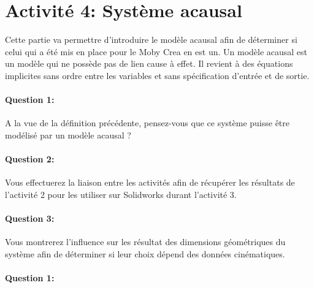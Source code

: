\section{Activité 4: Système acausal}

Cette partie va permettre d'introduire le modèle \og acausal \fg afin de déterminer si celui qui a été mis en place pour le Moby Crea en est un. Un modèle \og acausal \fg est un modèle qui ne possède pas de lien cause à effet. Il revient à des équations implicites sans ordre entre les variables et sans spécification d'entrée et de sortie.

\paragraph{Question 1:} A la vue de la définition précédente, pensez-vous que ce système puisse être modélisé par un modèle \og acausal \fg ?

\paragraph{Question 2:} Vous effectuerez la liaison entre les activités afin de récupérer les résultats de l'activité 2 pour les utiliser sur Solidworks durant l'activité 3.

\paragraph{Question 3:} Vous montrerez l'influence sur les résultat des dimensions géométriques du système afin de déterminer si leur choix dépend des données cinématiques.



\pagestyle{correction}\setcounter{section}{0}

\paragraph{Question 1:}
